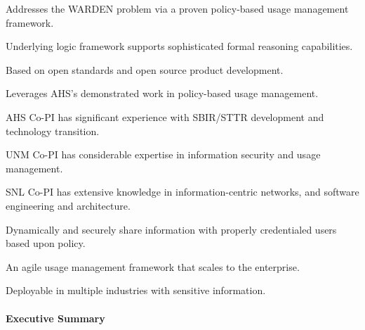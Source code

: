 \documentclass{sbir}
\begin{document}
\begin{evalbox}
  \begin{evalitemize}
     \item Addresses the WARDEN problem via a proven policy-based usage management framework.
     \item Underlying logic framework supports sophisticated formal reasoning capabilities.
  \end{evalitemize}
  \begin{evalitemize}
     \item Based on open standards and open source product development.
     \item Leverages AHS's demonstrated work in policy-based usage management.
  \end{evalitemize}
  \begin{evalitemize}
     \item AHS Co-PI has significant experience with SBIR/STTR development and technology transition.
     \item UNM Co-PI has considerable expertise in information security and usage management.
     \item SNL Co-PI has extensive knowledge in information-centric networks, and software engineering and architecture.
  \end{evalitemize}
  \begin{evalitemize}
     \item Dynamically and securely share information with properly credentialed users based upon policy.
     \item An agile usage management framework that scales to the enterprise.
  \end{evalitemize}
  \begin{evalitemize}
     \item Deployable in multiple industries with sensitive information.
  \end{evalitemize}
\end{evalbox}

\paragraph{Executive Summary}
\end{document}
